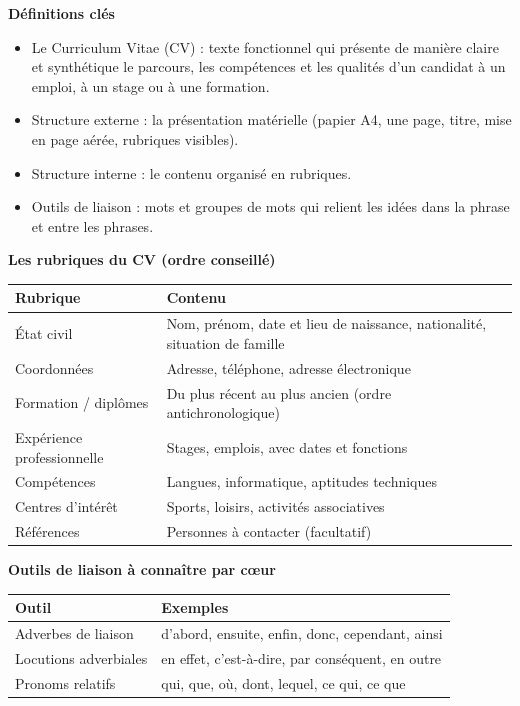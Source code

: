 \documentclass[11pt]{article}
\newcommand{\cle}[1]{{\popxbold\color{popdark}#1}}
\begin{document}
\begin{bilan}
\textbf{Définitions clés}
\begin{itemize}
\item Le \cle{Curriculum Vitae} (CV) : texte \cle{fonctionnel} qui présente de manière claire et synthétique le parcours, les compétences et les qualités d'un candidat à un emploi, à un stage ou à une formation.
\item \cle{Structure externe} : la présentation matérielle (papier A4, une page, titre, mise en page aérée, rubriques visibles).
\item \cle{Structure interne} : le contenu organisé en \cle{rubriques}.
\item Outils de \cle{liaison} : mots et groupes de mots qui relient les idées dans la phrase et entre les phrases.
\end{itemize}

\textbf{Les rubriques du CV (ordre conseillé)}
\begin{center}
\begin{tabularx}{\linewidth}{|l|X|}\hline
\rowcolor{popblueL} \textbf{Rubrique} & \textbf{Contenu} \\ \hline
État civil & Nom, prénom, date et lieu de naissance, nationalité, situation de famille \\ \hline
Coordonnées & Adresse, téléphone, adresse électronique \\ \hline
Formation / diplômes & Du plus récent au plus ancien (ordre antichronologique) \\ \hline
Expérience professionnelle & Stages, emplois, avec dates et fonctions \\ \hline
Compétences & Langues, informatique, aptitudes techniques \\ \hline
Centres d'intérêt & Sports, loisirs, activités associatives \\ \hline
Références & Personnes à contacter (facultatif) \\ \hline
\end{tabularx}
\end{center}

\textbf{Outils de liaison à connaître par cœur}
\begin{center}
\begin{tabularx}{\linewidth}{|l|X|}\hline
\rowcolor{popblueL} \textbf{Outil} & \textbf{Exemples} \\ \hline
Adverbes de liaison & d'abord, ensuite, enfin, donc, cependant, ainsi \\ \hline
Locutions adverbiales & en effet, c'est-à-dire, par conséquent, en outre \\ \hline
Pronoms relatifs & qui, que, où, dont, lequel, ce qui, ce que \\ \hline
\end{tabularx}
\end{center}


\end{bilan}
\end{document}
